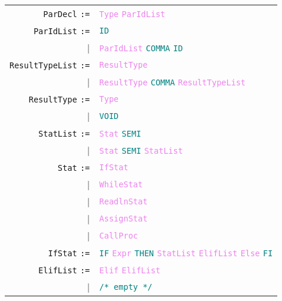 \documentclass[a4paper,12pt]{article}
\newcommand\nonterm[1]{\texttt{\textcolor{violet}{#1}}}
\newcommand\term[1]{\texttt{\textcolor{teal}{#1}}}
\newcommand\production[1]{\texttt{#1} \texttt{:=}}
\newcommand\emptyprod{\texttt{\textcolor{teal}{/* empty */}}}
\begin{document}
\begin{tabular}{rl}
	\production{ParDecl}            & \nonterm{Type} \nonterm{ParIdList} \\
	\production{ParIdList}           & \term{ID} \\
						  |& \nonterm{ParIdList} \term{COMMA} \term{ID} \\
	\production{ResultTypeList} & \nonterm{ResultType} \\
						  |& \nonterm{ResultType} \term{COMMA} \nonterm{ResultTypeList} \\
	\production{ResultType}       & \nonterm{Type} \\
						  |& \term{VOID} \\
	\production{StatList} 		   & \nonterm{Stat} \term{SEMI} \\
						  |& \nonterm{Stat} \term{SEMI} \nonterm{StatList} \\
	\production{Stat}                  & \nonterm{IfStat} \\
						  |& \nonterm{WhileStat} \\
						  |& \nonterm{ReadlnStat} \\
						  |& \nonterm{AssignStat} \\
						  |& \nonterm{CallProc} \\
    \production{IfStat}                   & \term{IF} \nonterm{Expr} \term{THEN} \nonterm{StatList} \nonterm{ElifList} \nonterm{Else} \term{FI} \\
    \production{ElifList}                 & \nonterm{Elif} \nonterm{ElifList} \\
    						|& \emptyprod \\
    \end{tabular}
\end{document}
